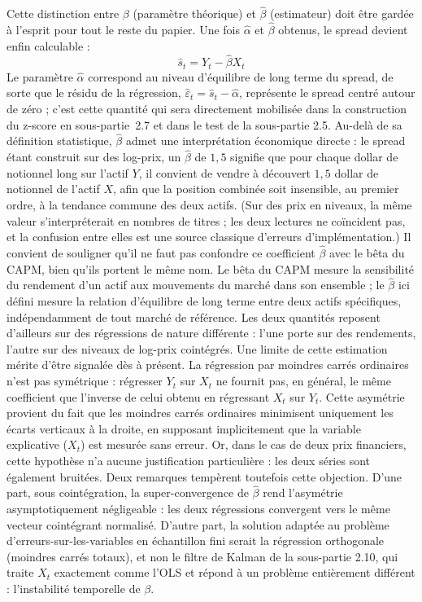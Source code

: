 \documentclass{article}
\begin{document}
Cette distinction entre $\beta$ (paramètre théorique) et $\hat{\beta}$ (estimateur) doit être gardée à l'esprit pour tout le reste du papier. Une fois $\hat\alpha$ et $\hat\beta$ obtenus, le spread devient enfin calculable :
\begin{equation}
\hat{s}_t = Y_t - \hat{\beta} X_t
\end{equation}
Le paramètre $\hat\alpha$ correspond au niveau d'équilibre de long terme du spread, de sorte que le résidu de la régression, $\hat\varepsilon_t = \hat{s}_t - \hat\alpha$, représente le spread centré autour de zéro ; c'est cette quantité qui sera directement mobilisée dans la construction du z-score en sous-partie~2.7 et dans le test de la sous-partie 2.5.
Au-delà de sa définition statistique, $\hat\beta$ admet une interprétation économique directe : le spread étant construit sur des log-prix, un $\hat\beta$ de $1{,}5$ signifie que pour chaque dollar de notionnel long sur l'actif $Y$, il convient de vendre à découvert $1{,}5$ dollar de notionnel de l'actif $X$, afin que la position combinée soit insensible, au premier ordre, à la tendance commune des deux actifs. (Sur des prix en niveaux, la même valeur s'interpréterait en nombres de titres ; les deux lectures ne coïncident pas, et la confusion entre elles est une source classique d'erreurs d'implémentation.)
Il convient de souligner qu'il ne faut pas confondre ce coefficient $\hat\beta$ avec le bêta du CAPM, bien qu'ils portent le même nom. Le bêta du CAPM mesure la sensibilité du rendement d'un actif aux mouvements du marché dans son ensemble ; le $\hat\beta$ ici défini mesure la relation d'équilibre de long terme entre deux actifs spécifiques, indépendamment de tout marché de référence. Les deux quantités reposent d'ailleurs sur des régressions de nature différente : l'une porte sur des rendements, l'autre sur des niveaux de log-prix cointégrés.
Une limite de cette estimation mérite d'être signalée dès à présent. La régression par moindres carrés ordinaires n'est pas symétrique : régresser $Y_t$ sur $X_t$ ne fournit pas, en général, le même coefficient que l'inverse de celui obtenu en régressant $X_t$ sur $Y_t$. Cette asymétrie provient du fait que les moindres carrés ordinaires minimisent uniquement les écarts verticaux à la droite, en supposant implicitement que la variable explicative ($X_t$) est mesurée sans erreur. Or, dans le cas de deux prix financiers, cette hypothèse n'a aucune justification particulière : les deux séries sont également bruitées. Deux remarques tempèrent toutefois cette objection. D'une part, sous cointégration, la super-convergence de $\hat\beta$ rend l'asymétrie asymptotiquement négligeable : les deux régressions convergent vers le même vecteur cointégrant normalisé. D'autre part, la solution adaptée au problème d'erreurs-sur-les-variables en échantillon fini serait la régression orthogonale (moindres carrés totaux), et non le filtre de Kalman de la sous-partie 2.10, qui traite $X_t$ exactement comme l'OLS et répond à un problème entièrement différent : l'instabilité temporelle de $\beta$.
\end{document}
